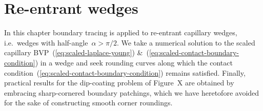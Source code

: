 \chapter{Re-entrant wedges}
\label{ch:re-entrant}

In this chapter
boundary tracing is applied to re-entrant capillary wedges,
i.e.~wedges with half-angle~$\alpha > \pi/2$.
We take a numerical solution to
the scaled capillary BVP~(\ref{eq:scaled-laplace-young})
\&~(\ref{eq:scaled-contact-boundary-condition})
in a wedge
and seek rounding curves along which
the contact condition~(\ref{eq:scaled-contact-boundary-condition})
remains satisfied.
Finally, practical results for the dip-coating problem
of Figure~X %
are obtained by embracing sharp-cornered boundary patchings,
which we have heretofore avoided
for the sake of constructing smooth corner roundings.

